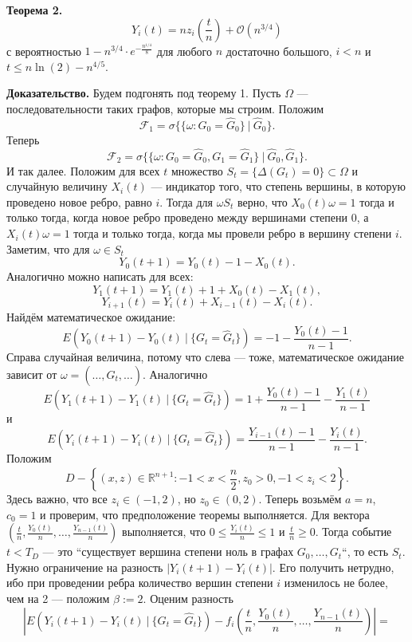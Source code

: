 \textbf{Теорема 2.} 
\[
    Y_i(t) = nz_i \left( \frac{t}{n} \right) + \mathcal O(n^{3/4})
\]
с вероятностью $1 - n^{3/4} \cdot e^{-\frac{n^{1/4}}{8}}$ для любого $n$ достаточно большого, $i < n$ и $t \le n \ln(2) - n^{4/5}$.

\textbf{Доказательство.} Будем подгонять под теорему 1.
Пусть $\Omega$ --- последовательности таких графов, которые мы строим.
Положим 
\[
    \mathcal F_1 = \sigma \{\{\omega: G_0 = \widehat G_0\}~|~\widehat G_0\}.
\]
Теперь 
\[
    \mathcal F_2 = \sigma \{\{\omega: G_0 = \widehat G_0, G_1 = \widehat G_1 \}~|~\widehat G_0, \widehat G_1\}.
\]
И так далее.
Положим для всех $t$ множество $S_t = \{\Delta(G_t) = 0\} \subset \Omega$ и случайную величину $X_i(t)$ --- индикатор того, что степень вершины, в которую проведено новое ребро, равно $i$.
Тогда для $\omega S_t$ верно, что $X_0(t) \omega = 1$ тогда и только тогда, когда новое ребро проведено между вершинами степени 0, а $X_i(t) \omega = 1$ тогда и только тогда, когда мы провели ребро в вершину степени $i$.
Заметим, что для $\omega \in S_t$
\[
    Y_0(t + 1) = Y_0(t) - 1 - X_0(t).
\]
Аналогично можно написать для всех:
\[
    Y_1(t + 1) = Y_1(t) + 1 + X_0(t) - X_1(t),
\]
\[
    Y_{i+1}(t) = Y_i(t) + X_{i-1}(t) - X_i(t).
\]
Найдём математическое ожидание:
\[
    E(Y_0(t + 1) - Y_0(t)~|~\{G_t = \widehat G_t\}) = -1 - \frac{Y_0(t) - 1}{n - 1}.
\]
Справа случайная величина, потому что слева --- тоже, математическое ожидание зависит от $\omega = (\dots, \widehat G_t, \dots)$.
Аналогично
\[
    E(Y_1(t + 1) - Y_1(t)~|~\{G_t = \widehat G_t\}) = 1 + \frac{Y_0(t) - 1}{n - 1} - \frac{Y_1(t)}{n - 1}
\]
и
\[
    E(Y_i(t + 1) - Y_i(t)~|~\{G_t = \widehat G_t\}) = \frac{Y_{i-1}(t) - 1}{n - 1} - \frac{Y_i(t)}{n - 1}.
\]
Положим
\[
    D - \left\{(x, z) \in \mathbb R^{n+1}: -1 < x < \frac{n}{2}, z_0 > 0, -1 < z_i < 2\right\}.
\]
Здесь важно, что все $z_i \in (-1, 2)$, но $z_0 \in (0, 2)$.
Теперь возьмём $a = n$, $c_0 = 1$ и проверим, что предположение теоремы выполняется.
Для вектора $\left( \frac{t}{n}, \frac{Y_0(t)}{n}, \dots, \frac{Y_{n-1}(t)}{n} \right)$ выполняется, что $0 \le \frac{Y_i(t)}{n} \le 1$ и $\frac{t}{n} \ge 0$.
Тогда событие $t < T_D$ --- это ``существует вершина степени ноль в графах $G_0, \dots, G_t$``, то есть $S_t$.
Нужно ограничение на разность $|Y_i(t + 1) - Y_i(t)|$.
Его получить нетрудно, ибо при проведении ребра количество вершин степени $i$ изменилось не более, чем на 2 --- положим $\beta := 2$.
Оценим разность
\[
    \left| E(Y_i(t + 1) - Y_i(t)~|~\{G_t = \widehat G_t\}) - f_i \left( \frac{t}{n}, \frac{Y_0(t)}{n}, \dots, \frac{Y_{n-1}(t)}{n} \right) \right| = 
\]
